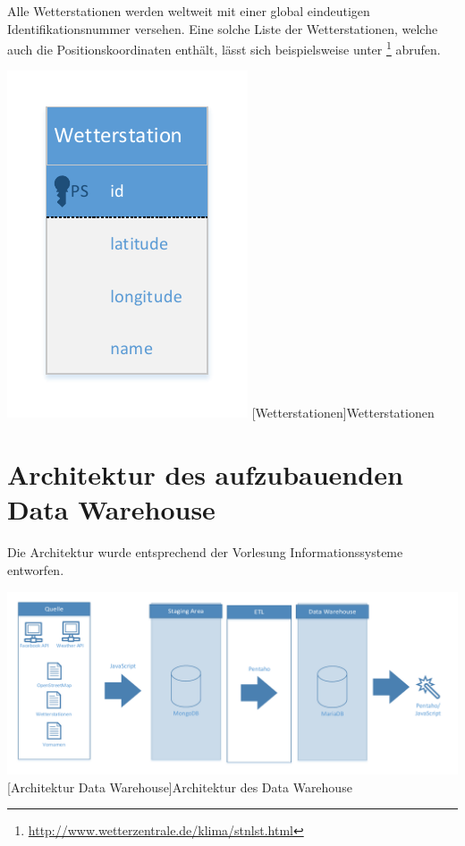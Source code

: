 \documentclass[a4paper,12pt]{scrartcl}
\makeatletter
\def\ScaleIfNeeded{%
\ifdim\Gin@nat@width>\linewidth
\linewidth
\else
\Gin@nat@width
\fi
}
\makeatother
\begin{document}
Alle Wetterstationen werden weltweit mit einer global eindeutigen Identifikationsnummer versehen. Eine solche Liste der Wetterstationen, welche auch die Positionskoordinaten enth\"alt, l\"asst sich beispielsweise unter \footnote{\url{http://www.wetterzentrale.de/klima/stnlst.html}} abrufen.

\begin{center}
\centering
\includegraphics[width=\ScaleIfNeeded]{../Wetterstation.pdf}%
[Wetterstationen]{Wetterstationen}%
\end{center}


\section{Architektur des aufzubauenden Data Warehouse}

Die Architektur wurde entsprechend der Vorlesung Informationssysteme entworfen.

\begin{center}
\centering
\includegraphics[width=\ScaleIfNeeded]{../Architektur.pdf}%
[Architektur Data Warehouse]{Architektur des Data Warehouse}%
\end{center}
\end{document}
